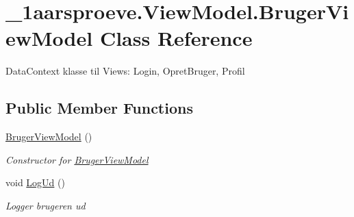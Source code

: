 \hypertarget{class__1aarsproeve_1_1_view_model_1_1_bruger_view_model}{}\section{\+\_\+1aarsproeve.\+View\+Model.\+Bruger\+View\+Model Class Reference}
\label{class__1aarsproeve_1_1_view_model_1_1_bruger_view_model}


Data\+Context klasse til Views\+: Login, Opret\+Bruger, Profil  


\subsection*{Public Member Functions}
\begin{DoxyCompactItemize}
\item 
\hyperlink{class__1aarsproeve_1_1_view_model_1_1_bruger_view_model_a2852c87e53378bf746f319770e026be5}{Bruger\+View\+Model} ()
\begin{DoxyCompactList}\small\item\em Constructor for \hyperlink{class__1aarsproeve_1_1_view_model_1_1_bruger_view_model}{Bruger\+View\+Model} \end{DoxyCompactList}\item 
void \hyperlink{class__1aarsproeve_1_1_view_model_1_1_bruger_view_model_a8c2d6da5fad3a9bdbbde9ce986dcbc74}{Log\+Ud} ()
\begin{DoxyCompactList}\small\item\em Logger brugeren ud \end{DoxyCompactList}\end{DoxyCompactItemize}

